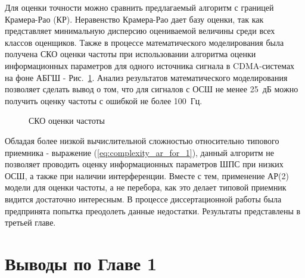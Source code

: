 Для оценки точности можно сравнить предлагаемый алгоритм с границей Крамера-Рао (КР). Неравенство Крамера-Рао дает базу оценки, так
как представляет минимальную дисперсию оцениваемой величины среди всех классов оценщиков.
Также в процессе математического моделирования была получена СКО оценки частоты при использовании алгоритма оценки информационных параметров для одного источника
сигнала в CDMA-системах на фоне АБГШ - \mbox{Рис. \ref{pic:crlb_vs_1sat_algo}}. Анализ результатов математического моделирования позволяет сделать  вывод о том,
что для сигналов с ОСШ не менее \mbox{25 дБ} можно получить оценку частоты с ошибкой не более \mbox{100 Гц}.

\begin{figure}[H]
\center{}
	\caption{СКО оценки частоты}
	\label{pic:crlb_vs_1sat_algo}
\end{figure}

Обладая более низкой вычислительной сложностью относительно типового приемника - выражение (\ref{eq:complexity_ar_for_1}), данный алгоритм не позволяет проводить
оценку информационных параметров ШПС при низких ОСШ, а также при наличии интерференции. Вместе с тем, применение АР(2) модели для оценки частоты, а не перебора,
как это делает типовой приемник видится достаточно интересным. В процессе диссертационной работы была предпринята попытка преодолеть данные недостатки. Результаты
представлены в третьей главе.

\section{Выводы по Главе 1}

